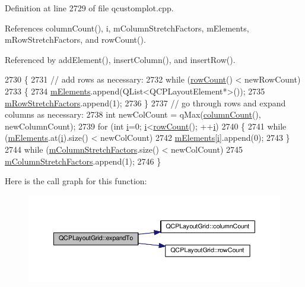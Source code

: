 Definition at line 2729 of file qcustomplot.\+cpp.



References column\+Count(), i, m\+Column\+Stretch\+Factors, m\+Elements, m\+Row\+Stretch\+Factors, and row\+Count().



Referenced by add\+Element(), insert\+Column(), and insert\+Row().


\begin{DoxyCode}
2730 \{
2731   \textcolor{comment}{// add rows as necessary:}
2732   \textcolor{keywordflow}{while} (\hyperlink{class_q_c_p_layout_grid_af8e6c7a05864ebe610c87756c7b9079c}{rowCount}() < newRowCount)
2733   \{
2734     \hyperlink{class_q_c_p_layout_grid_a3577d3855bf8ad20ef9079291a49f397}{mElements}.append(QList<QCPLayoutElement*>());
2735     \hyperlink{class_q_c_p_layout_grid_a36c85a7eaf342680fb9b8a4977486f16}{mRowStretchFactors}.append(1);
2736   \}
2737   \textcolor{comment}{// go through rows and expand columns as necessary:}
2738   \textcolor{keywordtype}{int} newColCount = qMax(\hyperlink{class_q_c_p_layout_grid_ac39074eafd148b82d0762090f258189e}{columnCount}(), newColumnCount);
2739   \textcolor{keywordflow}{for} (\textcolor{keywordtype}{int} \hyperlink{_comparision_pictures_2_createtest_image_8m_a6f6ccfcf58b31cb6412107d9d5281426}{i}=0; \hyperlink{_comparision_pictures_2_createtest_image_8m_a6f6ccfcf58b31cb6412107d9d5281426}{i}<\hyperlink{class_q_c_p_layout_grid_af8e6c7a05864ebe610c87756c7b9079c}{rowCount}(); ++\hyperlink{_comparision_pictures_2_createtest_image_8m_a6f6ccfcf58b31cb6412107d9d5281426}{i})
2740   \{
2741     \textcolor{keywordflow}{while} (\hyperlink{class_q_c_p_layout_grid_a3577d3855bf8ad20ef9079291a49f397}{mElements}.at(\hyperlink{_comparision_pictures_2_createtest_image_8m_a6f6ccfcf58b31cb6412107d9d5281426}{i}).size() < newColCount)
2742       \hyperlink{class_q_c_p_layout_grid_a3577d3855bf8ad20ef9079291a49f397}{mElements}[\hyperlink{_comparision_pictures_2_createtest_image_8m_a6f6ccfcf58b31cb6412107d9d5281426}{i}].append(0);
2743   \}
2744   \textcolor{keywordflow}{while} (\hyperlink{class_q_c_p_layout_grid_ac6aabe62339f94f18b9f8adab94b1840}{mColumnStretchFactors}.size() < newColCount)
2745     \hyperlink{class_q_c_p_layout_grid_ac6aabe62339f94f18b9f8adab94b1840}{mColumnStretchFactors}.append(1);
2746 \}
\end{DoxyCode}


Here is the call graph for this function\+:\nopagebreak
\begin{figure}[H]
\begin{center}
\leavevmode
\includegraphics[width=350pt]{class_q_c_p_layout_grid_a886c0dcbabd51a45da399e044552b685_cgraph}
\end{center}
\end{figure}




